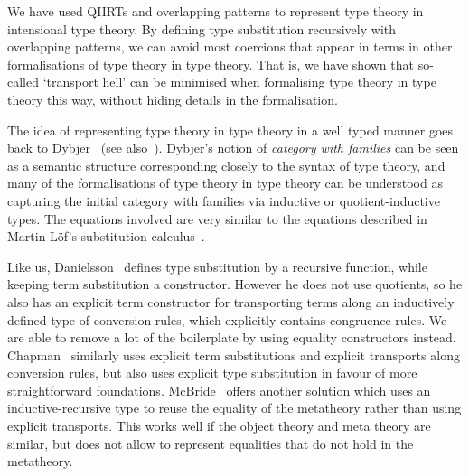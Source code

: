 \documentclass[a4paper,UKenglish,numberwithinsect,cleveref,thm-restate]{lipics-v2021}
\begin{document}
We have used QIIRTs and overlapping
patterns to represent type theory in intensional type theory. By defining type
substitution recursively with overlapping patterns, we can avoid most
coercions that appear in terms in other formalisations of type
theory in type theory. That is, we have shown that so-called
`transport hell' can be minimised when formalising type theory in type
theory this way, without hiding details in the formalisation.


The idea of representing type theory in type theory in a well typed manner goes back to Dybjer~\cite{Dybjer1996} (see also~\cite{Clairambault2014,Castellan2021}). Dybjer's notion of \emph{category with families} can be seen as a semantic structure corresponding closely to the syntax of type theory, and many of the formalisations of type theory in type theory can be understood as capturing the initial category with families via inductive or quotient-inductive types. The equations involved are very similar to the equations described in Martin-L\"of's substitution calculus~\cite{Martin-Lof1992}.

Like us, Danielsson~\cite{Danielsson2006} defines type substitution by a recursive function, while keeping term substitution a constructor. However he does not use quotients, so he also has an explicit term constructor for transporting terms along an inductively defined type of conversion rules, which explicitly contains congruence rules. We are able to remove a lot of the boilerplate by using equality constructors instead. Chapman~\cite{Chapman2009} similarly uses explicit term substitutions and explicit transports along conversion rules, but also uses explicit type substitution in favour of more straightforward foundations.
McBride~\cite{McBride2010} offers another solution which uses an inductive-recursive type to reuse the equality of the metatheory rather than using explicit transports. This works well if the object theory and meta theory are similar, but does not allow to represent equalities that do not hold in the metatheory.
\end{document}
